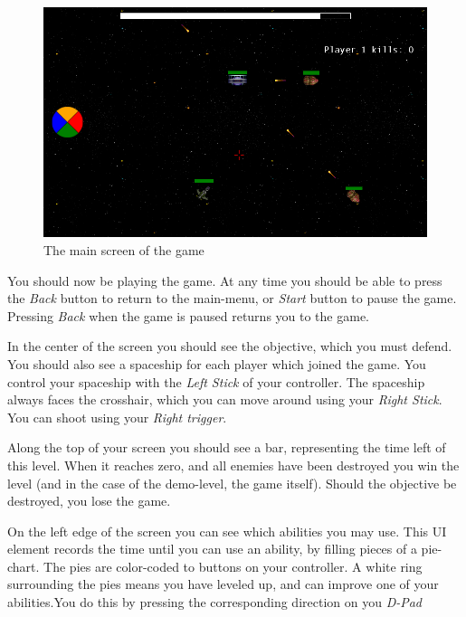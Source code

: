 \begin{figure}
    \begin{center}
    \includegraphics[width=\linewidth]{graphics/ingame}
    \caption{The main screen of the game}
    \label{fig:ingame}
    \end{center}
\end{figure}

You should now be playing the game. At any time you should be able to press
the \emph{Back} button to return to the main-menu, or \emph{Start} button to
pause the game. Pressing \emph{Back} when the game is paused returns you to
the game.

In the center of the screen you should see the objective, which you must 
defend. You should also see a spaceship for each player which joined the game.
You control your spaceship with the \emph{Left Stick} of your controller.
The spaceship always faces the crosshair, which you can move around using
your \emph{Right Stick}. You can shoot using your \emph{Right trigger}.

Along the top of your screen you should see a bar, representing the time
left of this level. When it reaches zero, and all enemies have been destroyed
you win the level (and in the case of the demo-level, the game itself).
Should the objective be destroyed, you lose the game.

On the left edge of the screen you can see which abilities you may use.
This UI element records the time until you can use an ability, by filling
pieces of a pie-chart. The pies are color-coded to buttons on your controller.
A white ring surrounding the pies means you have leveled up, and can improve
one of your abilities.You do this by pressing the corresponding direction
on you \emph{D-Pad}

